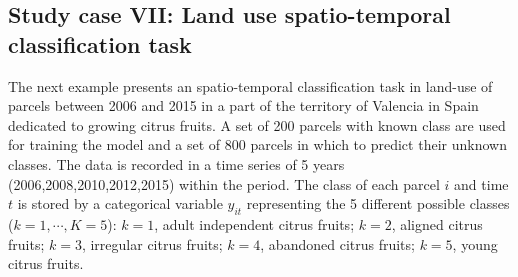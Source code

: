 \documentclass[]{interact}
\theoremstyle{plain}%
\theoremstyle{definition}
\theoremstyle{remark}
\begin{document}


\subsection{Study case VII: Land use spatio-temporal classification task}\label{sec:bf_caseVII}
The next example presents an spatio-temporal classification task in land-use of parcels between 2006 and 2015 in a part of the territory of Valencia in Spain dedicated to growing citrus fruits. A set of 200 parcels with known class are used for training the model and a set of 800 parcels in which to predict their unknown classes. The data is recorded in a time series of 5 years (2006,2008,2010,2012,2015) within the period. The class of each parcel $i$ and time $t$ is stored by a categorical variable $y_{it}$ representing the 5 different possible classes ($k=1,\cdots,K=5$): $k=1$, adult independent citrus fruits; $k=2$, aligned citrus fruits; $k=3$, irregular citrus fruits; $k=4$, abandoned citrus fruits; $k=5$, young citrus fruits. 
\end{document}
